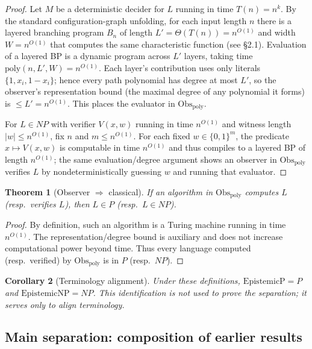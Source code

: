 \documentclass[12pt]{article}
\newtheorem{theorem}{Theorem}
\newtheorem{corollary}[theorem]{Corollary}
\theoremstyle{definition}
\theoremstyle{definition}
\theoremstyle{remark}
\theoremstyle{remark}
\begin{document}
\begin{proof}
Let $M$ be a deterministic decider for $L$ running in time $T(n)=n^k$. By the standard configuration-graph unfolding, for each input length $n$ there is a layered branching program $B_n$ of length $L'=\Theta(T(n))=n^{O(1)}$ and width $W=n^{O(1)}$ that computes the same characteristic function (see \S2.1). Evaluation of a layered BP is a dynamic program across $L'$ layers, taking time $\mathrm{poly}(n,L',W)=n^{O(1)}$. Each layer's contribution uses only literals $\{1, x_i, 1-x_i\}$; hence every path polynomial has degree at most $L'$, so the observer's representation bound (the maximal degree of any polynomial it forms) is $\le L'=n^{O(1)}$. This places the evaluator in $\mathrm{Obs}_{\mathrm{poly}}$.

For $L\in NP$ with verifier $V(x,w)$ running in time $n^{O(1)}$ and witness length $|w|\le n^{O(1)}$, fix $n$ and $m\le n^{O(1)}$. For each fixed $w\in\{0,1\}^m$, the predicate $x\mapsto V(x,w)$ is computable in time $n^{O(1)}$ and thus compiles to a layered BP of length $n^{O(1)}$; the same evaluation/degree argument shows an observer in $\mathrm{Obs}_{\mathrm{poly}}$ verifies $L$ by nondeterministically guessing $w$ and running that evaluator.
\end{proof}

\begin{theorem}[Observer $\Rightarrow$ classical]\label{thm:observer-to-classical}
If an algorithm in $\mathrm{Obs}_{\mathrm{poly}}$ computes $L$ (resp.\ verifies $L$), then $L\in P$ (resp.\ $L\in NP$).
\end{theorem}

\begin{proof}
By definition, such an algorithm is a Turing machine running in time $n^{O(1)}$. The representation/degree bound is auxiliary and does not increase computational power beyond time. Thus every language computed (resp.\ verified) by $\mathrm{Obs}_{\mathrm{poly}}$ is in $P$ (resp.\ $NP$).
\end{proof}

\begin{corollary}[Terminology alignment]\label{cor:terminology-alignment}
Under these definitions, $\mathrm{EpistemicP}=P$ and $\mathrm{EpistemicNP}=NP$. This identification is not used to prove the separation; it serves only to align terminology.
\end{corollary}

\subsection{Main separation: composition of earlier results}
\end{document}
